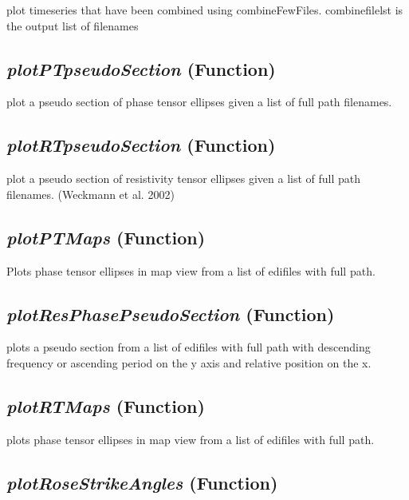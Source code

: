 plot timeseries that have been combined using combineFewFiles.
    combinefilelst is the output list of filenames

\subsection{\textit{plotPTpseudoSection} (Function)}
\label{ssec:imaging.mtplottools.plotPTpseudoSection}

plot a pseudo section of phase tensor ellipses given a list of 
    full path filenames.

\subsection{\textit{plotRTpseudoSection} (Function)}
\label{ssec:imaging.mtplottools.plotRTpseudoSection}

plot a pseudo section of resistivity tensor ellipses given a list of 
    full path filenames. (Weckmann et al. 2002)

\subsection{\textit{plotPTMaps} (Function)}
\label{ssec:imaging.mtplottools.plotPTMaps}

Plots phase tensor ellipses in map view from a list of edifiles with full 
    path.

\subsection{\textit{plotResPhasePseudoSection} (Function)}
\label{ssec:imaging.mtplottools.plotResPhasePseudoSection}

plots a  pseudo section from a list of edifiles with full path with descending 
    frequency or ascending period on the y axis and relative position on the x.

\subsection{\textit{plotRTMaps} (Function)}
\label{ssec:imaging.mtplottools.plotRTMaps}

plots phase tensor ellipses in map view from a list of edifiles with full 
    path.

\subsection{\textit{plotRoseStrikeAngles} (Function)}
\label{ssec:imaging.mtplottools.plotRoseStrikeAngles}



